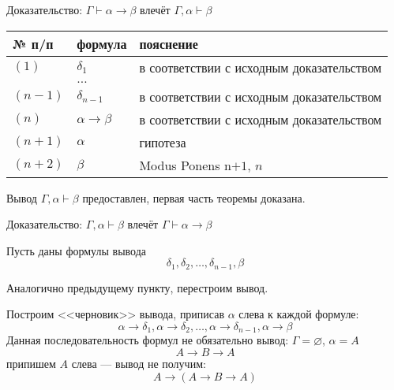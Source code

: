 \documentclass[aspectratio=169]{beamer}
\begin{document}
\begin{frame}{Доказательство: $\Gamma\vdash\alpha\rightarrow\beta$ влечёт $\Gamma,\alpha\vdash\beta$}
\begin{tabular}{lll}
№ п/п & формула & пояснение\\
\hline
$(1)$ & $\delta_1$ & в соответствии с исходным доказательством\\
    & $\dots$ \\
$(n-1)$ & $\delta_{n-1}$ & в соответствии с исходным доказательством\\
$(n)$ & $\alpha\rightarrow\beta $ & в соответствии с исходным доказательством\\
$(n+1)$ & $\alpha$ & гипотеза\\
$(n+2)$ & $\beta$ & Modus Ponens n$+1$, $n$
\end{tabular}\pause\vspace{1cm}

Вывод $\Gamma,\alpha\vdash\beta$ предоставлен, первая часть теоремы доказана.
\end{frame}

\begin{frame}{Доказательство: $\Gamma,\alpha\vdash\beta$ влечёт $\Gamma\vdash\alpha\rightarrow\beta$}

Пусть даны формулы вывода $$\delta_1,\delta_2,\dots,\delta_{n-1},\beta$$

Аналогично предыдущему пункту, перестроим вывод.\pause

Построим <<черновик>> вывода, приписав $\alpha$ слева к каждой формуле:
$$\alpha\rightarrow\delta_1,\alpha\rightarrow\delta_2,\dots,\alpha\rightarrow\delta_{n-1},\alpha\rightarrow\beta$$\pause
Данная последовательность формул не обязательно вывод: $\Gamma=\varnothing$, $\alpha = A$
$$A\rightarrow B\rightarrow A$$\pause
припишем $A$ слева --- вывод не получим:
$$A \rightarrow (A\rightarrow B\rightarrow A)$$
\end{frame}
\end{document}
